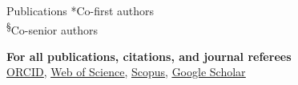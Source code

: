 \documentclass{resume}
\begin{document}
\begin{rSection}{Publications}
*Co-first authors\\
\textsuperscript{\S}Co-senior authors

\textbf{For all publications, citations, and journal referees}
\\\href{https://orcid.org/0000-0001-9650-7575}{\underline{ORCID}}, \href{https://www.webofscience.com/wos/author/record/837504}{\underline{Web of Science}}, \href{https://www.scopus.com/authid/detail.uri?authorId=57193451888}{\underline{Scopus}}, \href{https://scholar.google.com/citations?user=i-2xZBQAAAAJ}{\underline{Google Scholar}}

\end{rSection}

\end{document}
